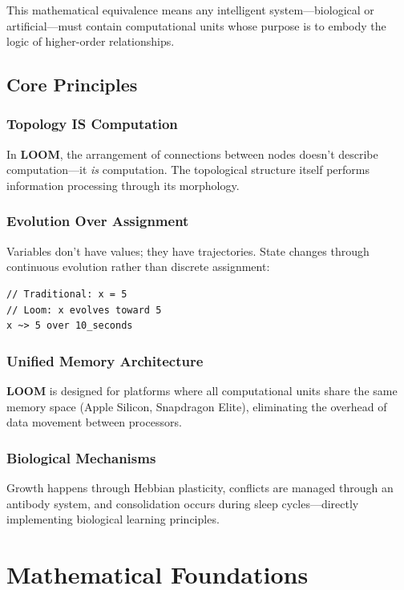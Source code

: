 \documentclass[12pt,a4paper,openany]{book} %
\newcommand{\loom}{\textbf{LOOM}}
\begin{document}
This mathematical equivalence means any intelligent system—biological or artificial—must contain computational units whose purpose is to embody the logic of higher-order relationships.

\section{Core Principles}

\subsection{Topology IS Computation}
In \loom{}, the arrangement of connections between nodes doesn't describe computation—it \textit{is} computation. The topological structure itself performs information processing through its morphology.

\subsection{Evolution Over Assignment}
Variables don't have values; they have trajectories. State changes through continuous evolution rather than discrete assignment:
\vspace{0.5em}
\begin{lstlisting}[language=loom]
// Traditional: x = 5
// Loom: x evolves toward 5
x ~> 5 over 10_seconds
\end{lstlisting}
\vspace{0.5em}

\subsection{Unified Memory Architecture}
\loom{} is designed for platforms where all computational units share the same memory space (Apple Silicon, Snapdragon Elite), eliminating the overhead of data movement between processors.

\subsection{Biological Mechanisms}
Growth happens through Hebbian plasticity, conflicts are managed through an antibody system, and consolidation occurs during sleep cycles—directly implementing biological learning principles.

\chapter{Mathematical Foundations}
\end{document}
